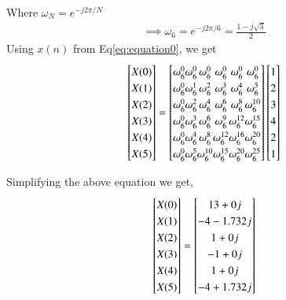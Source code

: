 \documentclass[journal,12pt,twocolumn]{IEEEtran}
\renewcommand\thesection{\arabic{section}}
\begin{document}
\begin{enumerate}[label=\thesection.\arabic*.,ref=\thesection.\theenumi]
Where $\omega_{N} = e^{-j2\pi/N}$
\begin{align}
\implies \omega_{6} = e^{-j2\pi/6} = \frac{1-j\sqrt{3}}{2}
\end{align}
\newline
Using $x(n)$ from Eq\eqref{eq:equation0}, we get
\begin{equation}
\renewcommand{\arraystretch}{1.25}
\setlength\arraycolsep{0.01pt}
\begin{bmatrix} 
X(0) \\ X(1) \\ X(2) \\ X(3) \\ X(4) \\ X(5) 
\end{bmatrix}
=
\begin{bmatrix}
\omega^{0}_{6} & \omega^{0}_{6} & \omega^{0}_{6} & \omega^{0}_{6} & \omega^{0}_{6} & \omega^{0}_{6}\\
\omega^{0}_{6} & \omega^{1}_{6} & \omega^{2}_{6} & \omega^{3}_{6} & \omega^{4}_{6} & \omega^{5}_{6}\\
\omega^{0}_{6} & \omega^{2}_{6} & \omega^{4}_{6} & \omega^{6}_{6} & \omega^{8}_{6} & \omega^{10}_{6}\\
\omega^{0}_{6} & \omega^{3}_{6} & \omega^{6}_{6} & \omega^{9}_{6} & \omega^{12}_{6} & \omega^{15}_{6}\\
\omega^{0}_{6} & \omega^{4}_{6} & \omega^{8}_{6} & \omega^{12}_{6} & \omega^{16}_{6} & \omega^{20}_{6}\\
\omega^{0}_{6} & \omega^{5}_{6} & \omega^{10}_{6} & \omega^{15}_{6} & \omega^{20}_{6} & \omega^{25}_{6} 
\end{bmatrix}
\begin{bmatrix}
1 \\ 2 \\ 3 \\ 4 \\ 2 \\ 1
\end{bmatrix}
\end{equation}

Simplifying the above equation we get,
\begin{equation}
\renewcommand{\arraystretch}{1.25}
\setlength\arraycolsep{0.01pt}
\begin{bmatrix} 
X(0) \\ X(1) \\ X(2) \\ X(3) \\ X(4) \\ X(5) 
\end{bmatrix}
=
\begin{bmatrix}
13+0j \\ -4-1.732j \\ 1+0j  \\ -1+0j \\ 1+0j \\ -4+1.732j
\end{bmatrix}
\end{equation}



\end{enumerate}
\end{document}
